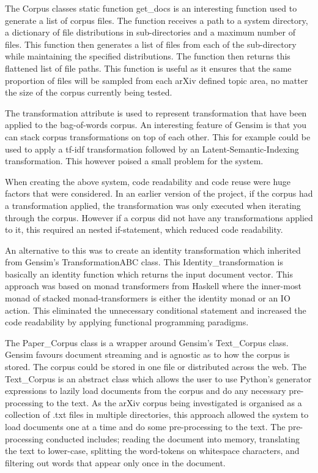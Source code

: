 The Corpus classes static function get\_docs is an interesting function used to generate a list of corpus files.
The function receives a path to a system directory, a dictionary of file distributions in sub-directories and a maximum number of files.
This function then generates a list of files from each of the sub-directory while maintaining the specified distributions.
The function then returns this flattened list of file paths.
This function is useful as it ensures that the same proportion of files will be sampled from each arXiv defined topic area, no matter the size of the corpus currently being tested.

The transformation attribute is used to represent transformation that have been applied to the bag-of-words corpus.
An interesting feature of Gensim is that you can stack corpus transformations on top of each other.
This for example could be used to apply a tf-idf transformation followed by an Latent-Semantic-Indexing transformation.
This however poised a small problem for the system.

When creating the above system, code readability and code reuse were huge factors that were considered.
In an earlier version of the project, if the corpus had a transformation applied, the transformation was only executed when iterating through the corpus.
However if a corpus did not have any transformations applied to it, this required an nested if-statement, which reduced code readability.

An alternative to this was to create an identity transformation which inherited from Gensim's TransformationABC class.
This Identity\_transformation is basically an identity function which returns the input document vector.
This approach was based on monad transformers from Haskell where the inner-most monad of stacked monad-transformers is either the identity monad or an IO action.
This eliminated the unnecessary conditional statement and increased the code readability by applying functional programming paradigms.

The Paper\_Corpus class is a wrapper around Gensim's Text\_Corpus class.
Gensim favours document streaming and is agnostic as to how the corpus is stored.
The corpus could be stored in one file or distributed across the web.
The Text\_Corpus is an abstract class which allows the user to use Python's generator expressions to lazily load documents from the corpus and do any necessary pre-processing to the text.
As the arXiv corpus being investigated is organised as a collection of .txt files in multiple directories, this approach allowed the system to load documents one at a time and do some pre-processing to the text.
The pre-processing conducted includes; reading the document into memory, translating the text to lower-case, splitting the word-tokens on whitespace characters, and filtering out words that appear only once in the document.

